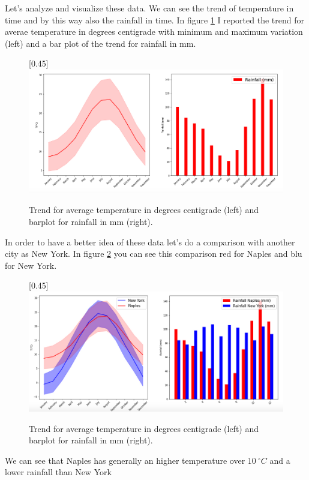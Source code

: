 \documentclass[a4paper, 12pt, oneside]{book}
\begin{document}
Let's analyze and visualize these data. 
We can see the trend of temperature in time and by this way also the rainfall in time. 
In figure \ref{fig:np_temp_rain} I reported the trend for averae temperature in degrees centigrade with minimum and maximum variation (left) and a bar plot of the trend for rainfall in mm.

\begin{figure}[!htb]
		\centering
		\scalebox{0.4}[0.45]{\includegraphics{immagini/np_temp_rain.png}}
		\caption{Trend for average temperature in degrees centigrade (left) and barplot for rainfall in mm (right).}
		\label{fig:np_temp_rain}
	\end{figure}

In order to have a better idea of these data let's do a comparison with another city as New York. In figure \ref{fig:ny_temp_rain} you can see this comparison red for Naples and blu for New York.

\begin{figure}[!htb]
		\centering
		\scalebox{0.4}[0.45]{\includegraphics{immagini/ny_temp_rain.png}}
		\caption{Trend for average temperature in degrees centigrade (left) and barplot for rainfall in mm (right).}
		\label{fig:ny_temp_rain}
	\end{figure}

We can see that Naples has generally an higher temperature over $10~ ^{\circ} C$ and a lower rainfall than New York
\end{document}
